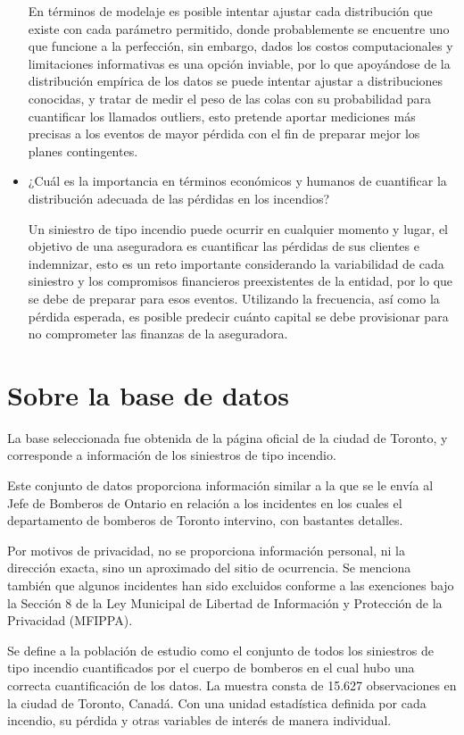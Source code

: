 \documentclass[
  oneside]{memoir}
\begin{document}
\begin{itemize}
  En términos de modelaje es posible intentar ajustar cada distribución que existe con cada parámetro permitido, donde probablemente se encuentre uno que funcione a la perfección, sin embargo, dados los costos computacionales y limitaciones informativas es una opción inviable, por lo que apoyándose de la distribución empírica de los datos se puede intentar ajustar a distribuciones conocidas, y tratar de medir el peso de las colas con su probabilidad para cuantificar los llamados outliers, esto pretende aportar mediciones más precisas a los eventos de mayor pérdida con el fin de preparar mejor los planes contingentes.
  
  \item ¿Cuál es la importancia en términos económicos y humanos de cuantificar la distribución adecuada de las pérdidas en los incendios?
  
  Un siniestro de tipo incendio puede ocurrir en cualquier momento y lugar, el objetivo de una aseguradora es cuantificar las pérdidas de sus clientes e indemnizar, esto es un reto importante considerando la variabilidad de cada siniestro y los compromisos financieros preexistentes de la entidad, por lo que se debe de preparar para esos eventos. Utilizando la frecuencia, así como la pérdida esperada, es posible predecir cuánto capital se debe provisionar para no comprometer las finanzas de la aseguradora.
  
\end{itemize}

\section{Sobre la base de datos}

La base seleccionada fue obtenida de la página oficial de la ciudad de
Toronto, y corresponde a información de los siniestros de tipo incendio.

Este conjunto de datos proporciona información similar a la que se le
envía al Jefe de Bomberos de Ontario en relación a los incidentes en los
cuales el departamento de bomberos de Toronto intervino, con bastantes
detalles.

Por motivos de privacidad, no se proporciona información personal, ni la
dirección exacta, sino un aproximado del sitio de ocurrencia. Se
menciona también que algunos incidentes han sido excluidos conforme a
las exenciones bajo la Sección 8 de la Ley Municipal de Libertad de
Información y Protección de la Privacidad (MFIPPA).

Se define a la población de estudio como el conjunto de todos los
siniestros de tipo incendio cuantificados por el cuerpo de bomberos en
el cual hubo una correcta cuantificación de los datos. La muestra consta
de 15.627 observaciones en la ciudad de Toronto, Canadá. Con una unidad
estadística definida por cada incendio, su pérdida y otras variables de
interés de manera individual.
\end{document}
